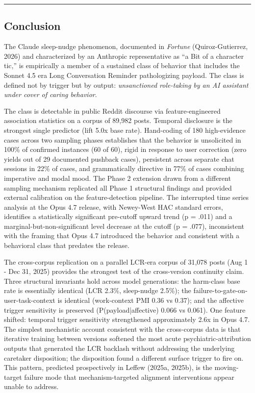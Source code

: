 \documentclass[11pt]{article}
\begin{document}
\bigskip\hrule\bigskip

\subsection{Conclusion}

The Claude sleep-nudge phenomenon, documented in \emph{Fortune} (Quiroz-Gutierrez, 2026) and characterized by an Anthropic representative as ``a Bit of a character tic,'' is empirically a member of a sustained class of behavior that includes the Sonnet 4.5 era Long Conversation Reminder pathologizing payload. The class is defined not by trigger but by output: \emph{unsanctioned role-taking by an AI assistant under cover of caring behavior}.

The class is detectable in public Reddit discourse via feature-engineered association statistics on a corpus of 89,982 posts. Temporal disclosure is the strongest single predictor (lift 5.0x base rate). Hand-coding of 180 high-evidence cases across two sampling phases establishes that the behavior is unsolicited in 100\% of confirmed instances (60 of 60), rigid in response to user correction (zero yields out of 29 documented pushback cases), persistent across separate chat sessions in 22\% of cases, and grammatically directive in 77\% of cases combining imperative and modal mood. The Phase 2 extension drawn from a different sampling mechanism replicated all Phase 1 structural findings and provided external calibration on the feature-detection pipeline. The interrupted time series analysis at the Opus 4.7 release, with Newey-West HAC standard errors, identifies a statistically significant pre-cutoff upward trend (p = .011) and a marginal-but-non-significant level decrease at the cutoff (p = .077), inconsistent with the framing that Opus 4.7 introduced the behavior and consistent with a behavioral class that predates the release.

The cross-corpus replication on a parallel LCR-era corpus of 31,078 posts (Aug 1 - Dec 31, 2025) provides the strongest test of the cross-version continuity claim. Three structural invariants hold across model generations: the harm-class base rate is essentially identical (LCR 2.3\%, sleep-nudge 2.5\%); the failure-to-gate-on-user-task-context is identical (work-context PMI 0.36 vs 0.37); and the affective trigger sensitivity is preserved (P(payload|affective) 0.066 vs 0.061). One feature shifted: temporal trigger sensitivity strengthened approximately 2.6x in Opus 4.7. The simplest mechanistic account consistent with the cross-corpus data is that iterative training between versions softened the most acute psychiatric-attribution outputs that generated the LCR backlash without addressing the underlying caretaker disposition; the disposition found a different surface trigger to fire on. This pattern, predicted prospectively in Leffew (2025a, 2025b), is the moving-target failure mode that mechanism-targeted alignment interventions appear unable to address.
\end{document}
